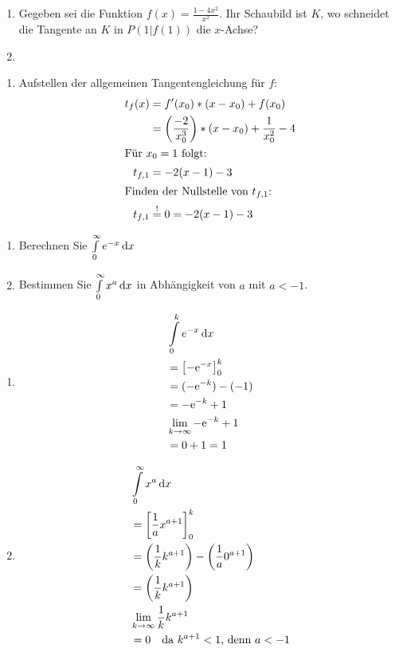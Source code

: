   \begin{enumerate}
    \item Gegeben sei die Funktion $f(x) = \frac{1-4x^2}{x^2}$. Ihr Schaubild ist $K$, wo schneidet die Tangente an $K$ in $P(1|f(1))$ die $x$-Achse?
		\item
  \end{enumerate}
	\begin{lsg}{}
		\begin{enumerate}
			\item Aufstellen der allgemeinen Tangentengleichung für $f$:
			\begin{align*}
				t_f(x)&=f'(x_0)*(x-x_0)+f(x_0)\\
							&=\left(\frac{-2}{x_0^3}\right)*(x-x_0)+\frac{1}{x_0^2}-4\\
				\intertext{Für $x_0=1$ folgt:}
				t_{f,1}&=-2(x-1)-3\\
				\intertext{Finden der Nullstelle von $t_{f,1}$:}
				t_{f,1}&\overset!=0=-2(x-1)-3\\
			\end{align*}
		\end{enumerate}
	\end{lsg}



	\begin{enumerate}
		\item Berechnen Sie $\int\limits^\infty_0 e^{-x}\,\mathrm{d} x$
		\item	Bestimmen Sie $\int\limits^\infty_0 x^a\,\mathrm{d} x$ in Abhängigkeit von $a$ mit $a < -1$.
	\end{enumerate}
	\begin{lsg}{}
		\begin{enumerate}
			\item \begin{align*}
				&\int\limits^k_0 e^{-x}\,\mathrm{d} x\\
				&=\left[-\mathrm{e}^{-x}\right]_0^k\\
				&=(-\mathrm{e}^{-k})-(-1)\\
				&=-\mathrm{e}^{-k}+1\\
				&\lim\limits_{k\rightarrow \infty}-\mathrm{e}^{-k}+1\\
				&=0+1=1
			\end{align*}
			\item \begin{align*}
				&\int\limits^\infty_0 x^a\,\mathrm{d} x\\
				&=\left[\frac1 a x^{a+1}\right]_0^k\\
				&=\left(\frac1 k k^{a+1}\right)-\left(\frac1 a 0^{a+1}\right)\\
				&=\left(\frac1 k k^{a+1}\right)\\
				&\lim\limits_{k\rightarrow \infty}\frac1 k k^{a+1}\\
				&=0\quad \text{da $k^{a+1}<1$, denn $a<-1$}
			\end{align*}
		\end{enumerate}
	\end{lsg}



